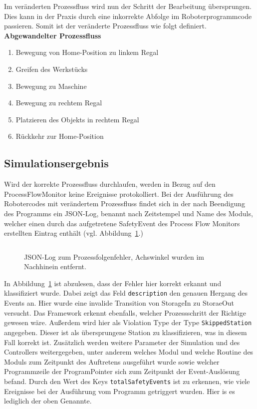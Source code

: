 Im veränderten Prozessfluss wird nun der Schritt der Bearbeitung übersprungen.
Dies kann in der Praxis durch eine inkorrekte Abfolge im Roboterprogrammcode
passieren. Somit ist der veränderte Prozessfluss wie folgt definiert.
\newpage
\textbf{Abgewandelter Prozessfluss}
\begin{enumerate}
  \item Bewegung von Home-Position zu linkem Regal
  \item Greifen des Werkstücks
  \item Bewegung zu Maschine
  \item Bewegung zu rechtem Regal
  \item Platzieren des Objekts in rechtem Regal
  \item Rückkehr zur Home-Position
\end{enumerate}

\subsection{Simulationsergebnis}
Wird der korrekte Prozessfluss durchlaufen, werden in Bezug auf den
ProcessFlowMonitor keine Ereignisse protokolliert.
Bei der Ausführung des Robotercodes mit verändertem Prozessfluss findet sich in
der nach Beendigung des Programms ein JSON-Log, benannt nach
Zeitstempel und Name des Moduls,
welcher einen durch das aufgetretene SafetyEvent des Process Flow Monitors
erstellten Eintrag enthält (vgl. Abbildung~\ref{listing:processflowerror}.)

\begin{figure}[H]
  \inputminted[fontsize=\footnotesize]{json}{code-snippets/processflowerror.json}
  \caption{JSON-Log zum Prozessfolgenfehler, Achswinkel wurden im Nachhinein
  entfernt.}
  \label{listing:processflowerror}
\end{figure}

In Abbildung~\ref{listing:processflowerror} ist abzulesen, dass der
Fehler hier korrekt erkannt und klassifiziert wurde. Dabei zeigt das Feld
\texttt{description} den genauen Hergang des Events an. Hier wurde eine invalide
Transition von StorageIn zu StoraeOut versucht. Das Framework erkennt
ebenfalls, welcher Prozessschritt der Richtige gewesen wäre. Außerdem wird hier
als Violation Type der Type \texttt{SkippedStation} angegeben. Dieser ist als
übersprungene Station zu klassifizieren, was in diesem Fall korrekt ist.
Zusätzlich werden weitere Parameter der Simulation und des Controllers
weitergegeben, unter anderem welches Modul und welche Routine des Moduls zum
Zeitpunkt des Auftretens ausgeführt wurde sowie welcher Programmzeile der
ProgramPointer sich zum Zeitpunkt der Event-Auslösung befand. Durch den Wert des
Keys \texttt{totalSafetyEvents} ist zu erkennen, wie viele Ereignisse bei der
Ausführung vom Programm getriggert wurden. Hier is es lediglich der oben
Genannte.

